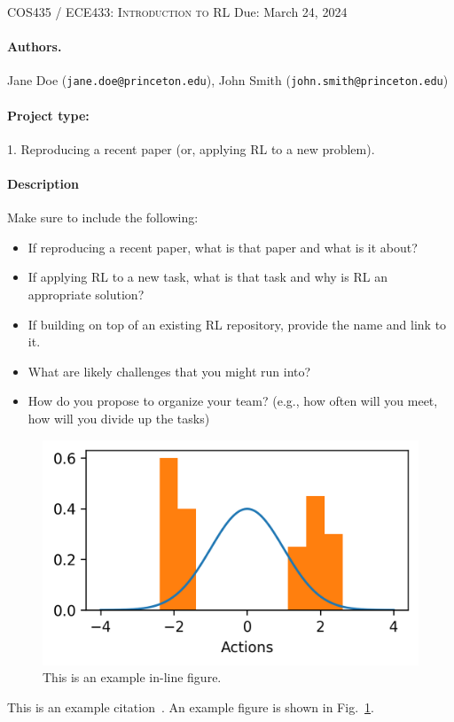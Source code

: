 \documentclass{article}
\begin{document}
\newcommand{\lectureTitle}{Project Proposal: YOUR TITLE HERE}
\newcommand{\lectureDate}{Due: March 24, 2024}

\textsc{COS435 / ECE433: Introduction to RL} \hfill \lectureDate
\vspace{1em}

\maketitle

\paragraph{Authors.} Jane Doe (\texttt{jane.doe@princeton.edu}), John Smith (\texttt{john.smith@princeton.edu})

\paragraph{Project type:}
1. 
Reproducing a recent paper (or, applying RL to a new problem).

\paragraph{Description}

Make sure to include the following:
\begin{itemize}
    \item If reproducing a recent paper, what is that paper and what is it about?
    \item If applying RL to a new task, what is that task and why is RL an appropriate solution?
    \item If building on top of an existing RL repository, provide the name and link to it.
    \item What are likely challenges that you might run into?
    \item How do you propose to organize your team? (e.g., how often will you meet, how will you divide up the tasks)
\end{itemize}

\begin{figure}
\centering
\includegraphics[width=\linewidth]{figures/actions-multimodal.png}
\caption{This is an example in-line figure. \label{fig:example}}
\end{figure}
This is an example citation~\citep{jaynes1957information}. An example figure is shown in Fig.~\ref{fig:example}.

{\footnotesize



}
\end{document}
